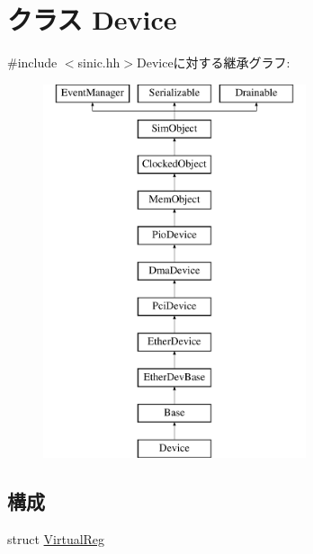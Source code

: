 \hypertarget{classSinic_1_1Device}{
\section{クラス Device}
\label{classSinic_1_1Device}
}


{\ttfamily \#include $<$sinic.hh$>$}Deviceに対する継承グラフ:\begin{figure}[H]
\begin{center}
\leavevmode
\includegraphics[height=11cm]{classSinic_1_1Device}
\end{center}
\end{figure}
\subsection*{構成}
\begin{DoxyCompactItemize}
\item 
struct \hyperlink{structSinic_1_1Device_1_1VirtualReg}{VirtualReg}
\end{DoxyCompactItemize}
